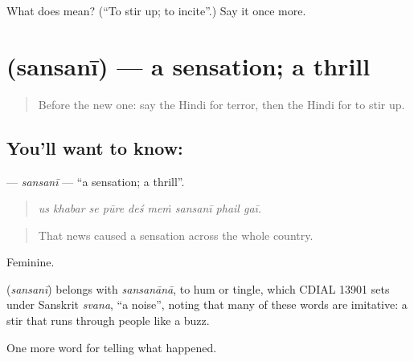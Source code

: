 \begin{tcolorbox}[breakable,colback=teal!4,colframe=teal!35!black,title={Before you move on}]
What does  mean? (\textquotedblleft{}To stir up; to incite\textquotedblright{}.) Say it once more.
\end{tcolorbox}
\section[\texorpdfstring{\hi{सनसनी} (sansanī)}{सनसनी (sansanī)}]{ (sansanī) — a sensation; a thrill}

\label{lesson:HI-C314-sansani}



\begin{quote}
Before the new one: say the Hindi for terror, then the Hindi for to stir up.
\end{quote}

\subsection*{You'll want to know: }
\textbf{} — \emph{sansanī} — \textquotedblleft{}a sensation; a thrill\textquotedblright{}.

\begin{quote}
        
\end{quote}

\begin{quote}
\emph{us khabar se pūre deś meṁ sansanī phail gaī.}
\end{quote}

\begin{quote}
That news caused a sensation across the whole country.
\end{quote}

Feminine.

\begin{cousinweb}
\textbf{} (\emph{sansanī}) belongs with \emph{sansanānā}, to hum or tingle, which CDIAL 13901 sets under Sanskrit \emph{svana}, \textquotedblleft{}a noise\textquotedblright{}, noting that many of these words are imitative: a stir that runs through people like a buzz.
\end{cousinweb}

\begin{grammarlens}[title={What you've built}]
One more word for telling what happened.
\end{grammarlens}

